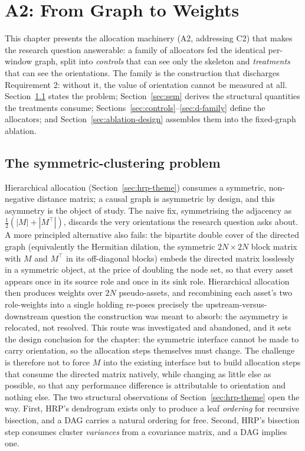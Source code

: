\chapter{A2: From Graph to Weights}
\label{chap:sensitivity}

This chapter presents the allocation machinery (A2, addressing C2) that makes
the research question answerable: a family of allocators fed the identical
per-window graph, split
into \emph{controls} that can see only the skeleton and \emph{treatments}
that can see the orientations. The family is the construction that
discharges
Requirement 2: without it, the value of orientation cannot be measured at
all. Section~\ref{sec:symm} states the problem;
Section~\ref{sec:sem} derives the structural quantities the treatments
consume; Sections~\ref{sec:controls}--\ref{sec:d-family} define the
allocators; and Section~\ref{sec:ablation-design} assembles them into the
fixed-graph ablation.

\section{The symmetric-clustering problem}
\label{sec:symm}

Hierarchical allocation (Section~\ref{sec:hrp-theme}) consumes a symmetric,
non-negative distance matrix; a causal graph is asymmetric by design, and
this asymmetry is the object of study. The naive fix, symmetrising the
adjacency as
$\tfrac{1}{2}(|M| + |M^\top|)$, discards the very orientations the research
question asks
about. A more principled alternative also fails: the
bipartite double cover of the directed graph (equivalently the Hermitian
dilation, the symmetric $2N{\times}2N$ block matrix with $M$ and $M^{\top}$
in its off-diagonal blocks) embeds the directed matrix losslessly
in a symmetric object, at the price of doubling the node set, so that every
asset appears once in its source role and once in its sink role.
Hierarchical allocation then produces weights over $2N$ pseudo-assets, and
recombining each asset's two role-weights into a single holding re-poses
precisely the upstream-versus-downstream question the construction was meant
to absorb: the asymmetry is relocated, not resolved. This route was
investigated and abandoned, and it sets the design conclusion for the
chapter: the
symmetric interface cannot be made to carry orientation, so the
allocation steps themselves must change. The challenge is therefore not to
force $M$ into the existing
interface but to build allocation steps that consume the directed
matrix natively, while changing as little else as possible, so that any
performance difference is attributable to orientation and nothing else. The
two structural observations of Section~\ref{sec:hrp-theme} open the way.
First, HRP's dendrogram exists only to produce a leaf \emph{ordering} for
recursive bisection, and a DAG carries a natural ordering for free.
Second, HRP's bisection step consumes cluster \emph{variances} from a
covariance matrix, and a DAG implies one.

